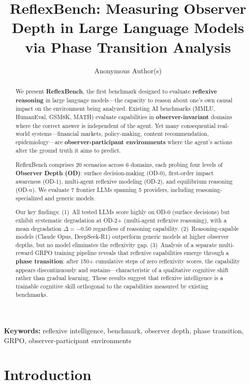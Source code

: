 \documentclass{article}
\title{ReflexBench: Measuring Observer Depth in Large Language Models\\via Phase Transition Analysis}
\author{
  Anonymous Author(s)
}
\begin{document}
\maketitle

\begin{abstract}
We present \textbf{ReflexBench}, the first benchmark designed to evaluate \textbf{reflexive reasoning} in large language models---the capacity to reason about one's own causal impact on the environment being analyzed. Existing AI benchmarks (MMLU, HumanEval, GSM8K, MATH) evaluate capabilities in \textbf{observer-invariant} domains where the correct answer is independent of the agent. Yet many consequential real-world systems---financial markets, policy-making, content recommendation, epidemiology---are \textbf{observer-participant environments} where the agent's actions alter the ground truth it aims to predict.

ReflexBench comprises 20 scenarios across 6 domains, each probing four levels of \textbf{Observer Depth (OD)}: surface decision-making (OD-0), first-order impact awareness (OD-1), multi-agent reflexive modeling (OD-2), and equilibrium reasoning (OD-$n$). We evaluate 7 frontier LLMs spanning 5 providers, including reasoning-specialized and generic models.

Our key findings: (1)~All tested LLMs score highly on OD-0 (surface decisions) but exhibit systematic degradation at OD-2+ (multi-agent reflexive reasoning), with a mean degradation $\Delta = -0.50$ regardless of reasoning capability. (2)~Reasoning-capable models (Claude Opus, DeepSeek-R1) outperform generic models at higher observer depths, but no model eliminates the reflexivity gap. (3)~Analysis of a separate multi-reward GRPO training pipeline reveals that reflexive capabilities emerge through a \textbf{phase transition}: after 150+ cumulative steps of zero reflexivity scores, the capability appears discontinuously and sustains---characteristic of a qualitative cognitive shift rather than gradual learning. These results suggest that reflexive intelligence is a trainable cognitive skill orthogonal to the capabilities measured by existing benchmarks.
\end{abstract}

\noindent\textbf{Keywords:} reflexive intelligence, benchmark, observer depth, phase transition, GRPO, observer-participant environments

\section{Introduction}
\label{sec:intro}
\end{document}
